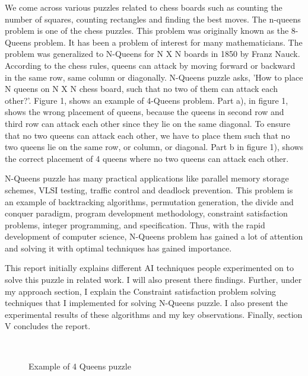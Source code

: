 \documentclass[conference]{IEEEtran}
\begin{document}
We come across various puzzles related to chess boards such as counting the number of squares, counting rectangles and finding the best moves. The n-queens problem is one of the chess puzzles. This problem was 
originally known as the 8-Queens problem. It has been a problem of interest for many mathematicians. The problem was generalized to N-Queens for N X N boards in 1850 by Franz Nauck. According to the chess rules, queens can attack by moving forward or backward in the same row, same column or diagonally. N-Queens puzzle asks, 'How to place N queens on N X N chess board, such that no two of them can attack each other?'. Figure 1, shows an example of 4-Queens problem. Part a), in figure 1, shows the wrong placement of queens, because the queens in second row and third row can attack each other since they lie on the same diagonal. To ensure that no two queens can attack each other, we have to place them such that no two queens lie on the same row, or column, or diagonal. Part b in figure 1), shows the correct placement of 4 queens where no two queens can attack each other. 
\par N-Queens puzzle has many practical applications like parallel memory storage schemes, VLSI testing, traffic control and deadlock prevention. This problem is an example of  backtracking algorithms, permutation generation, the divide and conquer paradigm, program development methodology, constraint satisfaction problems, integer programming, and specification. Thus, with the rapid development of computer science, N-Queens problem has gained a lot of attention and solving it with optimal techniques has gained importance.
\par This report initially explains different AI techniques people experimented on to solve this puzzle in related work. I will also present there findings. Further, under my approach section, I explain the Constraint satisfaction problem solving techniques that I implemented for solving N-Queens puzzle. I also present the experimental results of these algorithms and my key observations. Finally, section V concludes the report.

\begin{figure}%
    \centering
    \label{Figure1}
    \qquad
    \\
    \centering
 
    \label{Figure2}
\label{figure3}
\caption{Example of 4 Queens puzzle}
\end{figure}
\end{document}
